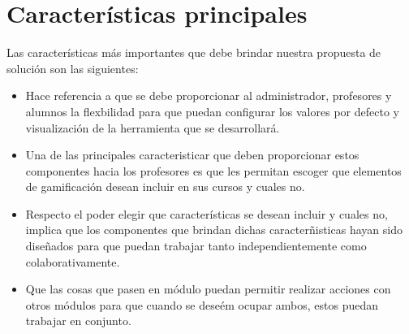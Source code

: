 \section{Características principales}


 Las características más
 importantes que debe brindar nuestra propuesta de solución son las siguientes:

    \begin{multicols}{2}
    \begin{itemize}

    \item[] Hace referencia a que se debe proporcionar al administrador, profesores
            y alumnos la flexbilidad para que puedan configurar los valores por defecto
            y visualización de la herramienta que se desarrollará.


    \item[] Una de las principales caracteristicar que deben proporcionar estos
            componentes hacia los profesores es que les permitan escoger que elementos
            de gamificación desean incluir en sus cursos y cuales no.\\



    \item[] Respecto el poder elegir que características se desean incluir y cuales no,
            implica que los componentes que brindan dichas caracterñisticas hayan sido
            diseñados para que puedan trabajar tanto independientemente como
            colaborativamente.


    \item[] Que las cosas que pasen en módulo puedan permitir realizar acciones con
            otros módulos para que cuando se deseém ocupar ambos, estos puedan trabajar
            en conjunto.

    \end{itemize}
    \end{multicols}
